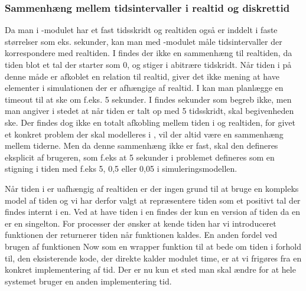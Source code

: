  
\subsubsection{Sammenhæng mellem tidsintervaller i realtid og diskrettid}
Da man i -modulet har et fast tidsskridt og
realtiden også er inddelt i faste størrelser
som eks. sekunder, kan man med -modulet måle tidsintervaller der
korrespondere med realtiden. I \des findes der ikke en
sammenhæng til  realtiden, da tiden blot et tal der starter som 0, og stiger
i abitrære tidskridt. Når tiden i \des på denne måde er afkoblet
en relation til realtid, giver det ikke mening at have elementer i simulationen der er afhængige af realtid. 
I \pycsp kan man planlægge en timeout til at ske om f.eks. 5 sekunder. I \des findes sekunder som
begreb ikke, men man  angiver i stedet at når tiden er talt op med 5 tidsskridt, skal
begivenheden ske. Der findes dog ikke en totalt afkobling mellem tiden i \des og realtiden, for givet et konkret problem der skal modelleres i \des, vil der altid være en sammenhæng mellem tiderne. Men da denne sammenhæng ikke er fast, skal den defineres eksplicit af brugeren, som f.eks at 5 sekunder i problemet defineres som en stigning i tiden med f.eks 5, 0,5 eller 0,05 i simuleringsmodellen.

Når tiden i \des er uafhængig af realtiden er der ingen grund til at bruge en kompleks model af tiden og vi har derfor valgt at repræsentere tiden som et positivt tal der findes internt i \sched en. Ved at have tiden i \sched en findes der kun en version af tiden da  \sched en er en singelton. For processer der ønsker at kende tiden har vi
introduceret funktionen  der returnerer tiden når funktionen kaldes. En anden fordel ved brugen af funktionen Now som en wrapper funktion til at bede om tiden i forhold til, den eksisterende kode, der direkte kalder modulet time, er at vi frigøres fra en konkret implementering af tid. Der er nu kun et sted man skal ændre for at hele systemet bruger en anden implementering tid.

